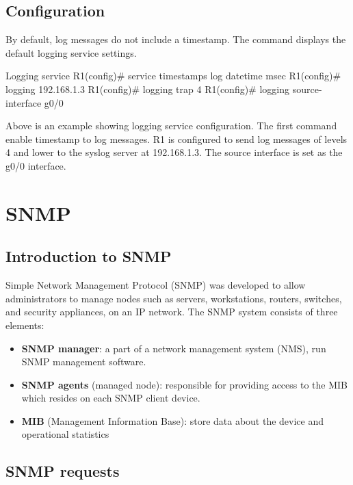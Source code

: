 \subsection{Configuration}

By default, log messages do not include a timestamp. The  command displays the default logging service settings.\\

\begin{sexylisting}{Logging service}
R1(config)# service timestamps log datetime msec
R1(config)# logging 192.168.1.3
R1(config)# logging trap 4
R1(config)# logging source-interface g0/0
\end{sexylisting}

Above is an example showing logging service configuration. The first command enable timestamp to log messages. R1 is configured to send log messages of levels 4 and lower to the syslog server at 192.168.1.3. The source interface is set as the g0/0 interface.

\section{SNMP}

\subsection{Introduction to SNMP}

Simple Network Management Protocol (SNMP) was developed to allow administrators to manage nodes such as servers, workstations, routers, switches, and security appliances, on an IP network. The SNMP system consists of three elements:

\begin{itemize}
\item \textbf{SNMP manager}: a part of a network management system (NMS), run SNMP management software. 
\item \textbf{SNMP agents} (managed node):  responsible for providing access to the MIB which resides on each SNMP client device.
\item \textbf{MIB} (Management Information Base): store data about the device and operational statistics 
\end{itemize}

\subsection{SNMP requests}

